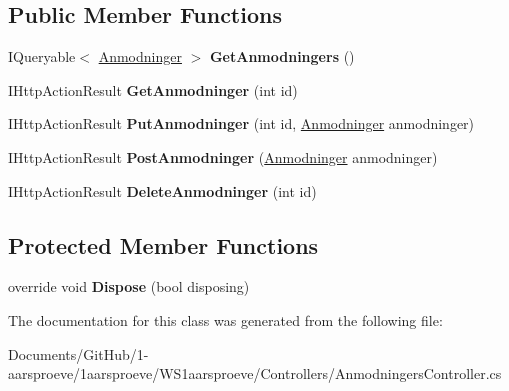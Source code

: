 \subsection*{Public Member Functions}
\begin{DoxyCompactItemize}
\item 
\hypertarget{class_w_s1aarsproeve_1_1_controllers_1_1_anmodningers_controller_af3273a14f0885034c1bc4e3e65de5773}{}I\+Queryable$<$ \hyperlink{class_w_s1aarsproeve_1_1_anmodninger}{Anmodninger} $>$ {\bfseries Get\+Anmodningers} ()\label{class_w_s1aarsproeve_1_1_controllers_1_1_anmodningers_controller_af3273a14f0885034c1bc4e3e65de5773}

\item 
\hypertarget{class_w_s1aarsproeve_1_1_controllers_1_1_anmodningers_controller_adf350dbe87d3e824879804a97865d8e5}{}I\+Http\+Action\+Result {\bfseries Get\+Anmodninger} (int id)\label{class_w_s1aarsproeve_1_1_controllers_1_1_anmodningers_controller_adf350dbe87d3e824879804a97865d8e5}

\item 
\hypertarget{class_w_s1aarsproeve_1_1_controllers_1_1_anmodningers_controller_aab5657d8ecf89168083ec5eac66945e0}{}I\+Http\+Action\+Result {\bfseries Put\+Anmodninger} (int id, \hyperlink{class_w_s1aarsproeve_1_1_anmodninger}{Anmodninger} anmodninger)\label{class_w_s1aarsproeve_1_1_controllers_1_1_anmodningers_controller_aab5657d8ecf89168083ec5eac66945e0}

\item 
\hypertarget{class_w_s1aarsproeve_1_1_controllers_1_1_anmodningers_controller_a53e831d63e4caffb811b6aac84a86de8}{}I\+Http\+Action\+Result {\bfseries Post\+Anmodninger} (\hyperlink{class_w_s1aarsproeve_1_1_anmodninger}{Anmodninger} anmodninger)\label{class_w_s1aarsproeve_1_1_controllers_1_1_anmodningers_controller_a53e831d63e4caffb811b6aac84a86de8}

\item 
\hypertarget{class_w_s1aarsproeve_1_1_controllers_1_1_anmodningers_controller_ae2b1c74b1ff5bfa7bd98360dd1602ad0}{}I\+Http\+Action\+Result {\bfseries Delete\+Anmodninger} (int id)\label{class_w_s1aarsproeve_1_1_controllers_1_1_anmodningers_controller_ae2b1c74b1ff5bfa7bd98360dd1602ad0}

\end{DoxyCompactItemize}
\subsection*{Protected Member Functions}
\begin{DoxyCompactItemize}
\item 
\hypertarget{class_w_s1aarsproeve_1_1_controllers_1_1_anmodningers_controller_ab5a9b5b63252dd4f260021d90f9d4d34}{}override void {\bfseries Dispose} (bool disposing)\label{class_w_s1aarsproeve_1_1_controllers_1_1_anmodningers_controller_ab5a9b5b63252dd4f260021d90f9d4d34}

\end{DoxyCompactItemize}


The documentation for this class was generated from the following file\+:\begin{DoxyCompactItemize}
\item 
Documents/\+Git\+Hub/1-\/aarsproeve/1aarsproeve/\+W\+S1aarsproeve/\+Controllers/Anmodningers\+Controller.\+cs\end{DoxyCompactItemize}
